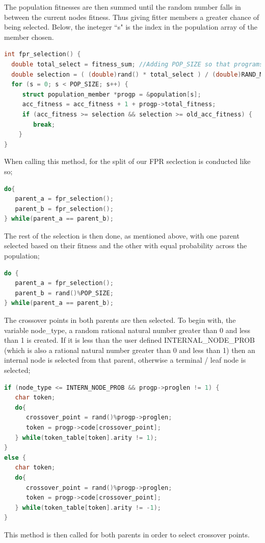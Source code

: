 \documentclass[a4paper,10.5pt]{article}
\begin{document}
The population fitnesses are then summed until the random number falls in between the current nodes fitness. Thus giving fitter members a greater chance of being selected. Below, the ineteger ``s" is the index in the population array of the member chosen.

\begin{lstlisting}[language=C]
int fpr_selection() {
  double total_select = fitness_sum; //Adding POP_SIZE so that programs with 0 entropy still have chance
  double selection = ( (double)rand() * total_select ) / (double)RAND_MAX;
  for (s = 0; s < POP_SIZE; s++) {
     struct population_member *progp = &population[s];
     acc_fitness = acc_fitness + 1 + progp->total_fitness;
     if (acc_fitness >= selection && selection >= old_acc_fitness) {
        break;
    }
}
\end{lstlisting}

When calling this method, for the split of our FPR seclection is conducted like so;

\begin{lstlisting}[language=C]
do{
   parent_a = fpr_selection();
   parent_b = fpr_selection();
} while(parent_a == parent_b);
\end{lstlisting}

The rest of the selection is then done, as mentioned above, with one parent selected based on their fitness and the other with equal probability across the population;

\begin{lstlisting}[language=C]
do {
   parent_a = fpr_selection();
   parent_b = rand()%POP_SIZE;
} while(parent_a == parent_b);
\end{lstlisting}

The crossover points in both parents are then selected. To begin with, the variable node\_type, a random rational natural number greater than 0 and less than 1 is created. If it is less than the user defined INTERNAL\_NODE\_PROB (which is also a rational natural number greater than 0 and less than 1) then an internal node is selected from that parent, otherwise a terminal / leaf node is selected;

\begin{lstlisting}[language=C]
if (node_type <= INTERN_NODE_PROB && progp->proglen != 1) {
   char token;
   do{
      crossover_point = rand()%progp->proglen;
      token = progp->code[crossover_point];
   } while(token_table[token].arity != 1);
}
else {
   char token;
   do{
      crossover_point = rand()%progp->proglen;
      token = progp->code[crossover_point];
   } while(token_table[token].arity != -1);
}
\end{lstlisting}
This method is then called for both parents in order to select crossover points. 
\end{document}
